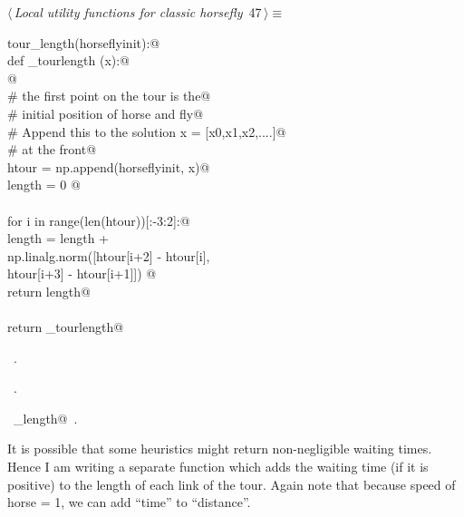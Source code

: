 \documentclass[11.5pt]{report}
\begin{document}
\begin{flushleft} \small\label{scrap59}\raggedright\small
{} $\langle\,${\itshape Local utility functions for classic horsefly}\nobreak\ {\footnotesize {47}}$\,\rangle\equiv$
\vspace{-1ex}
\begin{list}{}{} \item
\mbox{}\verb@def tour_length(horseflyinit):@\\
\mbox{}\verb@   def _tourlength (x):@\\
\mbox{}\verb@         @\\
\mbox{}\verb@        # the first point on the tour is the@\\
\mbox{}\verb@        # initial position of horse and fly@\\
\mbox{}\verb@        # Append this to the solution x = [x0,x1,x2,....]@\\
\mbox{}\verb@        # at the front@\\
\mbox{}\verb@        htour = np.append(horseflyinit, x)@\\
\mbox{}\verb@        length = 0 @\\
\mbox{}\verb@@\\
\mbox{}\verb@        for i in range(len(htour))[:-3:2]:@\\
\mbox{}\verb@                length = length + \@\\
\mbox{}\verb@                         np.linalg.norm([htour[i+2] - htour[i], \@\\
\mbox{}\verb@                                         htour[i+3] - htour[i+1]]) @\\
\mbox{}\verb@        return length@\\
\mbox{}\verb@@\\
\mbox{}\verb@   return _tourlength@\\
\mbox{}\verb@@{\NWsep}
\end{list}
\vspace{-1.5ex}
\footnotesize
\begin{list}{}{\setlength{\itemsep}{-\parsep}\setlength{\itemindent}{-\leftmargin}}
\item \NWtxtMacroDefBy\ .
\item \NWtxtMacroRefIn\ .
\item \NWtxtIdentsDefed\nobreak\  \verb@tour_length@\nobreak\ .
\item{}
\end{list}
\vspace{4ex}
\end{flushleft}
\vspace{-0.8cm}\newchunk It is possible that some heuristics might return non-negligible
      waiting times. Hence I am writing a separate function which
      adds the waiting time (if it is positive) to the length of 
      each link of the tour. Again note that because 
      speed of horse = 1, we can add ``time'' to ``distance''. 
\end{document}
